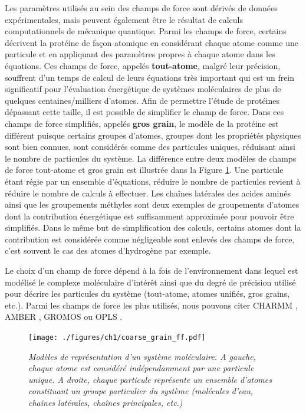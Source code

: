 Les paramètres utilisés au sein des champs de force sont dérivés de données expérimentales, mais peuvent également être le résultat de calculs computationnels de mécanique quantique. Parmi les champs de force, certains décrivent la protéine de façon atomique en considérant chaque atome comme une particule et en appliquant des paramètres propres à chaque atome dans les équations. Ces champs de force, appelés \textbf{tout-atome}, malgré leur précision, souffrent d'un temps de calcul de leurs équations très important qui est un frein significatif pour l'évaluation énergétique de systèmes moléculaires de plus de quelques centaines/milliers d'atomes. Afin de permettre l'étude de protéines dépassant cette taille, il est possible de simplifier le champ de force. Dans ces champs de force simplifiés, appelés \textbf{gros grain}, le modèle de la protéine est différent puisque certains groupes d'atomes, groupes dont les propriétés physiques sont bien connues, sont considérés comme des particules uniques, réduisant ainsi le nombre de particules du système. La différence entre deux modèles de champs de force tout-atome et gros grain est illustrée dans la Figure \ref{Fig:coarse_grain_ff}. Une particule étant régie par un ensemble d'équations, réduire le nombre de particules revient à réduire le nombre de calculs à effectuer. Les chaînes latérales des acides aminés ainsi que les groupements méthyles sont deux exemples de groupements d'atomes dont la contribution énergétique est suffisamment approximée pour pouvoir être simplifiés. Dans le même but de simplification des calculs, certains atomes dont la contribution est considérée comme négligeable sont enlevés des champs de force, c'est souvent le cas des atomes d'hydrogène par exemple.

Le choix d'un champ de force dépend à la fois de l'environnement dans lequel est modélisé le complexe moléculaire d'intérêt ainsi que du degré de précision utilisé pour décrire les particules du système (tout-atome, atomes unifiés, gros grains, etc.). Parmi les champs de force les plus utilisés, nous pouvons citer CHARMM \cite{brooks2009charmm}, AMBER \cite{pearlman1995amber}, GROMOS \cite{oostenbrink2004biomolecular} ou OPLS \cite{jorgensen1996development}.

\begin{figure}[htb]
  \centering
  {\texttt{[image: ./figures/ch1/coarse\_grain\_ff.pdf]}}
    \caption[Modèles de représentation d'un système moléculaire tout-atome et gros grain.]{\it Modèles de représentation d'un système moléculaire. A gauche, chaque atome est considéré indépendamment par une particule unique. A droite, chaque particule représente un ensemble d'atomes constituant un groupe particulier du système (molécules d'eau, chaînes latérales, chaînes principales, etc.)}
    \label{Fig:coarse_grain_ff}
  \hspace{0.2cm}
\end{figure}

